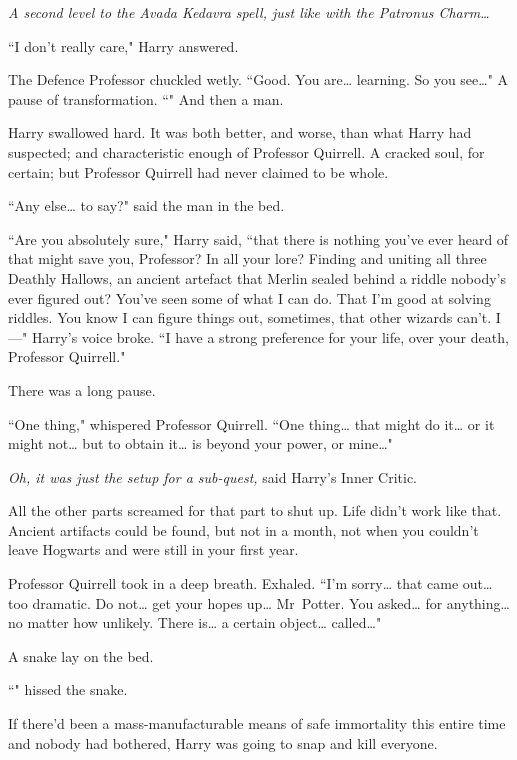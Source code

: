 \emph{A second level to the Avada Kedavra spell, just like with the Patronus Charm{\ldots}}

``I don't really care," Harry answered.

The Defence Professor chuckled wetly. ``Good. You are{\ldots} learning. So you see{\ldots}" A pause of transformation. ``" And then a man.

Harry swallowed hard. It was both better, and worse, than what Harry had suspected; and characteristic enough of Professor Quirrell. A cracked soul, for certain; but Professor Quirrell had never claimed to be whole.

``Any else{\ldots} to say?" said the man in the bed.

``Are you absolutely sure," Harry said, ``that there is nothing you've ever heard of that might save you, Professor? In all your lore? Finding and uniting all three Deathly Hallows, an ancient artefact that Merlin sealed behind a riddle nobody's ever figured out? You've seen some of what I can do. That I'm good at solving riddles. You know I can figure things out, sometimes, that other wizards can't. I—" Harry's voice broke. ``I have a strong preference for your life, over your death, Professor Quirrell."

There was a long pause.

``One thing," whispered Professor Quirrell. ``One thing{\ldots} that might do it{\ldots} or it might not{\ldots} but to obtain it{\ldots} is beyond your power, or mine{\ldots}"

\emph{Oh, it was just the setup for a sub-quest,} said Harry's Inner Critic.

All the other parts screamed for that part to shut up. Life didn't work like that. Ancient artifacts could be found, but not in a month, not when you couldn't leave Hogwarts and were still in your first year.

Professor Quirrell took in a deep breath. Exhaled. ``I'm sorry{\ldots} that came out{\ldots} too dramatic. Do not{\ldots} get your hopes up{\ldots} Mr~Potter. You asked{\ldots} for anything{\ldots} no matter how unlikely. There is{\ldots} a certain object{\ldots} called{\ldots}"

A snake lay on the bed.

``" hissed the snake.

If there'd been a mass-manufacturable means of safe immortality this entire time and nobody had bothered, Harry was going to snap and kill everyone.


